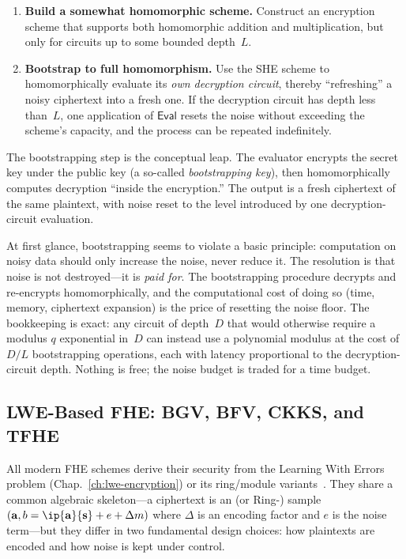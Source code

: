 \begin{enumerate}
\item \textbf{Build a somewhat homomorphic scheme.}  Construct an encryption scheme that supports both homomorphic addition and multiplication, but only for circuits up to some bounded depth~$L$.

\item \textbf{Bootstrap to full homomorphism.}  Use the SHE scheme to homomorphically evaluate its \emph{own decryption circuit}, thereby ``refreshing'' a noisy ciphertext into a fresh one.  If the decryption circuit has depth less than~$L$, one application of $\mathsf{Eval}$ resets the noise without exceeding the scheme's capacity, and the process can be repeated indefinitely.
\end{enumerate}

The bootstrapping step is the conceptual leap.  The evaluator encrypts the secret key under the public key (a so-called \emph{bootstrapping key}), then homomorphically computes decryption ``inside the encryption.''  The output is a fresh ciphertext of the same plaintext, with noise reset to the level introduced by one decryption-circuit evaluation.

At first glance, bootstrapping seems to violate a basic principle: computation on noisy data should only increase the noise, never reduce it.  The resolution is that noise is not destroyed---it is \emph{paid for}.  The bootstrapping procedure decrypts and re-encrypts homomorphically, and the computational cost of doing so (time, memory, ciphertext expansion) is the price of resetting the noise floor.  The bookkeeping is exact: any circuit of depth~$D$ that would otherwise require a modulus $q$ exponential in~$D$ can instead use a polynomial modulus at the cost of $D/L$ bootstrapping operations, each with latency proportional to the decryption-circuit depth.  Nothing is free; the noise budget is traded for a time budget.


\subsection{LWE-Based FHE: BGV, BFV, CKKS, and TFHE}
\label{subsec:fhe-schemes}

All modern FHE schemes derive their security from the Learning With Errors problem (Chap.~\ref{ch:lwe-encryption}) or its ring/module variants~\cite{Regev2009}.  They share a common algebraic skeleton---a ciphertext is an \lwe{} (or Ring-\lwe{}) sample $(\mathbf{a}, b = \ip{\mathbf{a}}{\mathbf{s}} + e + \Delta m)$ where $\Delta$ is an encoding factor and $e$ is the noise term---but they differ in two fundamental design choices: how plaintexts are encoded and how noise is kept under control.


